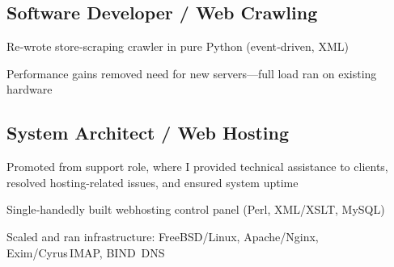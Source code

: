 \documentclass[letter,10pt]{article}
\begin{document}
\subsection{Software Developer / Web Crawling}
\begin{zitemize}
        \item Re‑wrote store‑scraping crawler in pure Python (event‑driven, XML)
        \item Performance gains removed need for new servers—full load ran on existing hardware
\end{zitemize}

\subsection{System Architect / Web Hosting}
\begin{zitemize}
        \item Promoted from support role, where I provided technical assistance to clients, resolved hosting-related issues, and ensured system uptime
        \item Single‑handedly built webhosting control panel (Perl, XML/XSLT, MySQL)
        \item Scaled and ran infrastructure: FreeBSD/Linux, Apache/Nginx, Exim/Cyrus IMAP, BIND DNS
\end{zitemize}
\end{document}
